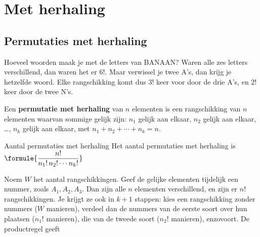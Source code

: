 \section{Met herhaling}

\subsection{Permutaties met herhaling}

Hoeveel woorden maak je met de letters van BANAAN? Waren alle zes letters verschillend, dan waren het er $6!$. Maar verwissel je twee A's, dan krijg je hetzelfde woord. Elke rangschikking komt dus $3!$ keer voor door de drie A's, en $2!$ keer door de twee N's.

\begin{theorie}
Een \textbf{\textcolor{accent}{permutatie met herhaling}} van $n$ elementen is een rangschikking van $n$ elementen waarvan sommige gelijk zijn: $n_1$ gelijk aan elkaar, $n_2$ gelijk aan elkaar, \ldots, $n_k$ gelijk aan elkaar, met $n_1 + n_2 + \cdots + n_k = n$.

\begin{stelling}{Aantal permutaties met herhaling}
Het aantal permutaties met herhaling is \quad $\formule{\dfrac{n!}{n_1! \, n_2! \cdots n_k!}}$
\end{stelling}

\begin{bewijs}
Noem $W$ het aantal rangschikkingen. Geef de gelijke elementen tijdelijk een nummer, zoals $A_1, A_2, A_3$. Dan zijn alle $n$ elementen verschillend, en zijn er $n!$ rangschikkingen. Je krijgt ze ook in $k + 1$ stappen: kies een rangschikking zonder nummers ($W$ manieren), verdeel dan de nummers van de eerste soort over hun plaatsen ($n_1!$ manieren), die van de tweede soort ($n_2!$ manieren), enzovoort. De productregel geeft
\end{bewijs}
\end{theorie}


